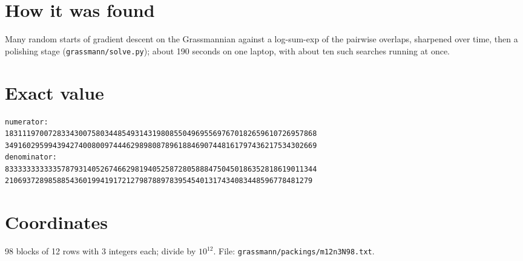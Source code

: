 \documentclass[11pt,a4paper]{article}
\begin{document}
\section{How it was found}
Many random starts of gradient descent on the Grassmannian against a log-sum-exp of the pairwise overlaps, sharpened over time, then a polishing stage (\texttt{grassmann/solve.py}); about 190 seconds on one laptop, with about ten such searches running at once.


\appendix
\section{Exact value}
{\small
\begin{verbatim}
numerator:
183111970072833430075803448549314319808550496955697670182659610726957868
349160295994394274008009744462989808789618846907448161797436217534302669
denominator:
833333333333578793140526746629819405258728058884750450186352818619011344
21069372898588543601994191721279878897839545401317434083448596778481279
\end{verbatim}}

\section{Coordinates}
98 blocks of 12 rows with 3 integers each; divide by $10^{12}$. File: \texttt{grassmann/packings/m12n3N98.txt}.
{\tiny
\begin{multicols}{3}
\end{multicols}}
\end{document}
